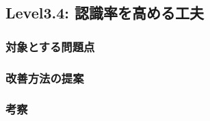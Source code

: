 \subsection{Level3.4: 認識率を高める工夫}
\subsubsection{対象とする問題点}

\subsubsection{改善方法の提案}

\subsubsection{考察}

